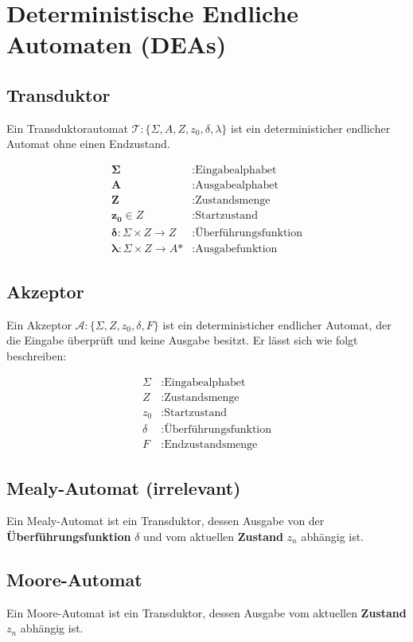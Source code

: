 \sloppy
\section{Deterministische Endliche Automaten (DEAs)}
\fussy
\subsection{Transduktor}
\begin{definition}
Ein Transduktorautomat $\mathcal{T}: \{\Sigma, A, Z, z_{0}, \delta, \lambda\}$ ist ein deterministicher endlicher Automat ohne einen Endzustand.
\end{definition}
\begin{align*}
    \mathbf{\Sigma} &: \text{Eingabealphabet}\\
    \mathbf{A} &: \text{Ausgabealphabet}\\
    \mathbf{Z} &: \text{Zustandsmenge}\\
    \mathbf{z_{0}} \in Z &: \text{Startzustand}\\
    \mathbf{\delta }: \Sigma \times Z \rightarrow Z &: \text{Überführungsfunktion}\\
    \mathbf{\lambda }: \Sigma \times Z \rightarrow A\text{*} &: \text{Ausgabefunktion}
\end{align*}

\subsection{Akzeptor}
\begin{definition}
Ein Akzeptor $\mathcal{A}: \{\Sigma, Z, z_{0}, \delta, F\}$ ist ein deterministicher endlicher Automat, der die Eingabe überprüft und keine Ausgabe besitzt. Er lässt sich wie folgt beschreiben:
\end{definition}
    \begin{align*}
    \Sigma &: \text{Eingabealphabet}\\
    Z &: \text{Zustandsmenge}\\
    z_{0} &: \text{Startzustand}\\
    \delta &: \text{Überführungsfunktion}\\
    F &: \text{Endzustandsmenge}
\end{align*}

\subsection{Mealy-Automat (irrelevant)}
\begin{definition}
    Ein Mealy-Automat ist ein Transduktor, dessen Ausgabe von der \textbf{Überführungsfunktion} $\delta$ und vom aktuellen \textbf{Zustand} $z_n$ abhängig ist.
\end{definition}
\subsection{Moore-Automat}
\begin{definition}
    Ein Moore-Automat ist ein Transduktor, dessen Ausgabe vom aktuellen \textbf{Zustand} $z_n$ abhängig ist.
\end{definition}